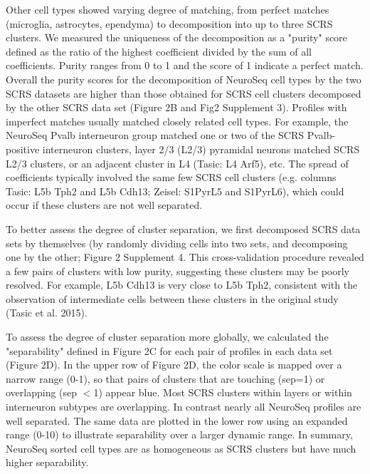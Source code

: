 Other cell types showed varying degree of matching, from perfect matches (microglia, astrocytes, ependyma) to decomposition into up to three SCRS clusters. We measured the uniqueness of the decomposition as a "purity" score defined as the ratio of the highest coefficient divided by the sum of all coefficients. Purity ranges from 0 to 1 and the score of 1 indicate a perfect match. Overall the purity scores for the decomposition of NeuroSeq cell types by the two SCRS datasets are higher than those obtained for SCRS cell clusters decomposed by the other SCRS data set (Figure 2B and Fig2 Supplement 3). Profiles with imperfect matches usually matched closely related cell types. For example, the NeuroSeq Pvalb interneuron group matched one or two of the SCRS Pvalb-positive interneuron clusters, layer 2/3 (L2/3) pyramidal neurons matched SCRS L2/3 clusters, or an adjacent cluster in L4 (Tasic: L4 Arf5), etc. The spread of coefficients typically involved the same few SCRS cell clusters (e.g. columns Tasic: L5b Tph2 and L5b Cdh13; Zeisel: S1PyrL5 and S1PyrL6), which could occur if these clusters are not well separated. 

To better assess the degree of cluster separation, we first decomposed SCRS data sets by themselves (by randomly dividing cells into two sets, and decomposing one by the other; Figure 2 Supplement 4. This cross-validation procedure revealed a few pairs of clusters with low purity, suggesting these clusters may be poorly resolved. For example, L5b Cdh13 is very close to L5b Tph2, consistent with the observation of intermediate cells between these clusters in the original study (Tasic et al. 2015).  

To assess the degree of cluster separation more globally, we calculated the "separability" defined in Figure 2C for each pair of profiles in each data set (Figure 2D). In the upper row of Figure 2D, the color scale is mapped over a narrow range (0-1), so that pairs of clusters that are touching (sep=1) or overlapping (sep $<$1) appear blue. Most SCRS clusters within layers or within interneuron subtypes are overlapping. In contrast nearly all NeuroSeq profiles are well separated. The same data are plotted in the lower row using an expanded range (0-10) to illustrate separability over a larger dynamic range. In summary, NeuroSeq sorted cell types are as homogeneous as SCRS clusters but have much higher separability. 


